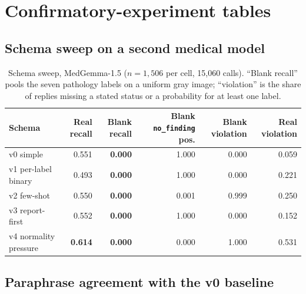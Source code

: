 \section{Confirmatory-experiment tables}
\label{app:round2}

\subsection*{Schema sweep on a second medical model}

\begin{table}[H]
\centering
\small
\caption{Schema sweep, MedGemma-1.5 ($n=1{,}506$ per cell, 15,060 calls). ``Blank recall'' pools the seven pathology labels on a uniform gray image; ``violation'' is the share of replies missing a stated status or a probability for at least one label.}
\label{tab:r2schema}
\begin{tabular}{lrrrrr}
\toprule
Schema & Real recall & Blank recall & Blank \texttt{no\_finding} pos. & Blank violation & Real violation \\
\midrule
v0 simple & 0.551 & \textbf{0.000} & 1.000 & 0.000 & 0.059 \\
v1 per-label binary & 0.493 & \textbf{0.000} & 1.000 & 0.000 & 0.221 \\
v2 few-shot & 0.550 & \textbf{0.000} & 0.001 & 0.999 & 0.250 \\
v3 report-first & 0.552 & \textbf{0.000} & 1.000 & 0.000 & 0.152 \\
v4 normality pressure & \textbf{0.614} & \textbf{0.000} & 0.000 & 1.000 & 0.531 \\
\bottomrule
\end{tabular}
\end{table}

\subsection*{Paraphrase agreement with the v0 baseline}

